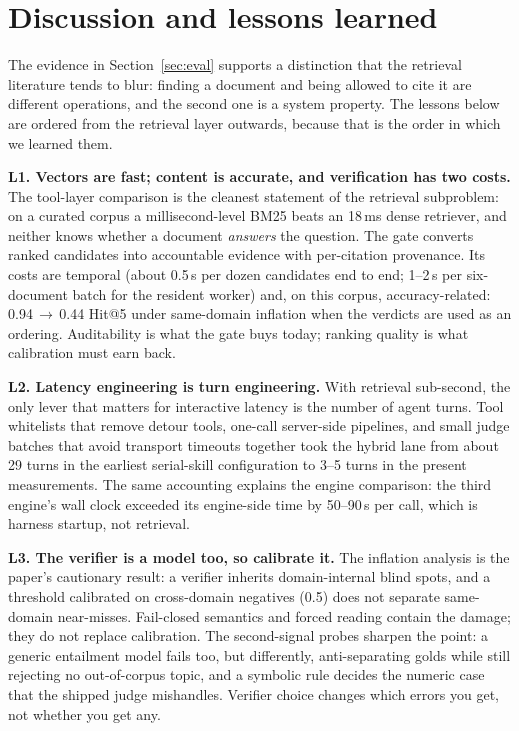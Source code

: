 \section{Discussion and lessons learned}
\label{sec:discussion}

The evidence in Section~\ref{sec:eval} supports a distinction that the
retrieval literature tends to blur: finding a document and being allowed to
cite it are different operations, and the second one is a system property. The
lessons below are ordered from the retrieval layer outwards, because that is
the order in which we learned them.

\noindent\textbf{L1. Vectors are fast; content is accurate, and verification
has two costs.} The tool-layer comparison is the cleanest statement of the
retrieval subproblem: on a curated corpus a millisecond-level BM25 beats an
18\,ms dense retriever, and neither knows whether a document \emph{answers}
the question. The gate converts ranked candidates into accountable evidence
with per-citation provenance. Its costs are temporal (about 0.5\,s per dozen
candidates end to end; 1--2\,s per six-document batch for the resident worker)
and, on this corpus, accuracy-related: 0.94\,$\to$\,0.44 Hit@5 under
same-domain inflation when the verdicts are used as an ordering. Auditability
is what the gate buys today; ranking quality is what calibration must earn
back.

\noindent\textbf{L2. Latency engineering is turn engineering.} With retrieval
sub-second, the only lever that matters for interactive latency is the number
of agent turns. Tool whitelists that remove detour tools, one-call server-side
pipelines, and small judge batches that avoid transport timeouts together took
the hybrid lane from about 29 turns in the earliest serial-skill configuration
to 3--5 turns in the present measurements. The same accounting explains the
engine comparison: the third engine's wall clock exceeded its engine-side time
by 50--90\,s per call, which is harness startup, not retrieval.

\noindent\textbf{L3. The verifier is a model too, so calibrate it.} The
inflation analysis is the paper's cautionary result: a verifier inherits
domain-internal blind spots, and a threshold calibrated on cross-domain
negatives (0.5) does not separate same-domain near-misses. Fail-closed
semantics and forced reading contain the damage; they do not replace
calibration. The second-signal probes sharpen the point: a generic entailment
model fails too, but differently, anti-separating golds while still rejecting
no out-of-corpus topic, and a symbolic rule decides the numeric case that the
shipped judge mishandles. Verifier choice changes which errors you get, not
whether you get any.

